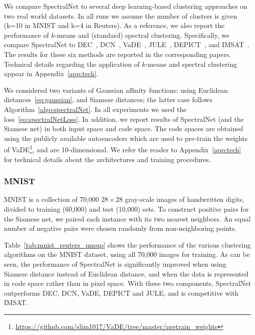 \documentclass{article} %
\begin{document}
We compare SpectralNet to several deep learning-based clustering approaches on two real world datasets. In all runs we assume the number of clusters is given (k=10 in MNIST and k=4 in Reuters). As a reference, we also report the performance of $k$-means and (standard) spectral clustering.
Specifically, we compare SpectralNet to DEC~\citep{xie2016unsupervised}, DCN~\citep{yang2016towards}, VaDE~\citep{zheng2016variational}, JULE~\citep{yang2016joint}, DEPICT~\citep{dizaji2017deep}, and IMSAT~\citep{hu2017learning}.
The results for these six methods are reported in the corresponding papers.
Technical details regarding the application of $k$-means and spectral clustering appear in Appendix~\ref{app:tech}.

We considered two variants of Gaussian affinity functions: using Euclidean distances~\eqref{eq:gaussian}, and Siamese distances; the latter case follows Algorithm~\ref{algo:spectralNet}. In all experiments we used the loss~\eqref{eq:spectralNetLoss}.
In addition, we report results of SpectralNet (and the Siamese net) in both input space and code space. The code spaces are obtained using the publicly available autoencoders which are used to pre-train the weights of VaDE\footnote{\url{https://github.com/slim1017/VaDE/tree/master/pretrain_weights}}, and are 10-dimensional. We refer the reader to Appendix~\ref{app:tech} for technical details about the architectures and training procedures.


\subsubsection {MNIST}
MNIST is a collection of 70,000 $28 \times 28$ gray-scale images of handwritten digits, divided to training (60,000) and test (10,000) sets.
To construct positive pairs for the Siamese net, we paired each instance with its two nearest neighbors. An equal number of negative pairs were chosen randomly from non-neighboring points.

Table~\ref{tab:mnist_reuters_unsup} shows the performance of the various clustering algorithms on the MNIST dataset, using all 70,000 images for training.
As can be seen, the performance of SpectralNet is significantly improved when using Siamese distance instead of Euclidean distance, and when the data is represented in code space rather than in pixel space. With these two components, SpectralNet outperforms DEC, DCN, VaDE, DEPICT and JULE, and is competitive with IMSAT.
\end{document}
